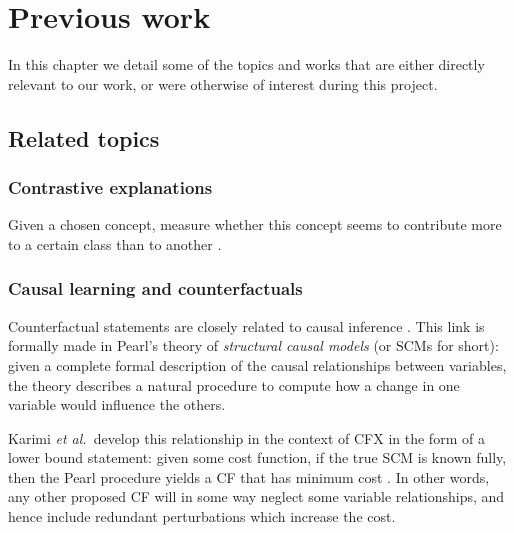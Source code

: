 \documentclass[../main.tex]{subfiles}
\begin{document}
\chapter{Previous work}
\label{ch:previous_work}

In this chapter we detail some of the topics and works that are either directly relevant to our work, or were otherwise of interest during this project.

\section{Related topics}

\subsection{Contrastive explanations}

Given a chosen concept, measure whether this concept seems to contribute more to a certain class than to another \cite{jacoviContrastive2021}.
\citenote{}

\subsection{Causal learning and counterfactuals}


Counterfactual statements are closely related to causal inference \cite{morganCounterfactuals2015}.
This link is formally made in Pearl's theory of \emph{structural causal models} (or SCMs for short): given a complete formal description of the causal relationships between variables, the theory describes a natural procedure to compute how a change in one variable would influence the others. 

Karimi \textsl{et al.}~develop this relationship in the context of CFX in the form of a lower bound statement: given some cost function, if the true SCM is known fully, then the Pearl procedure yields a CF that has minimum cost \cite{karimiAlgorithmic2020}.
In other words, any other proposed CF will in some way neglect some variable relationships, and hence include redundant perturbations which increase the cost.
\end{document}
